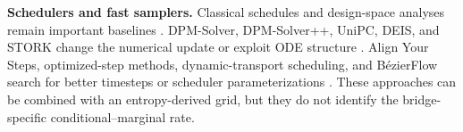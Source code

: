\documentclass{article}
\theoremstyle{plain}
\theoremstyle{definition}
\theoremstyle{remark}
\begin{document}
\textbf{Schedulers and fast samplers.} Classical schedules and design-space analyses remain important baselines \citep{nichol2021improved,kingma2021vdm,karras2022edm,lin2024common}. DPM-Solver, DPM-Solver++, UniPC, DEIS, and STORK change the numerical update or exploit ODE structure \citep{lu2022dpm,lu2022dpmsolverpp,zhao2023unipc,zhang2022deis,tan2026stork}. Align Your Steps, optimized-step methods, dynamic-transport scheduling, and B{\'e}zierFlow search for better timesteps or scheduler parameterizations \citep{sabour2024alignsteps,xue2024optimized,tsimpos2025lipschitz,min2026bezierflow}. These approaches can be combined with an entropy-derived grid, but they do not identify the bridge-specific conditional--marginal rate.


\end{document}
